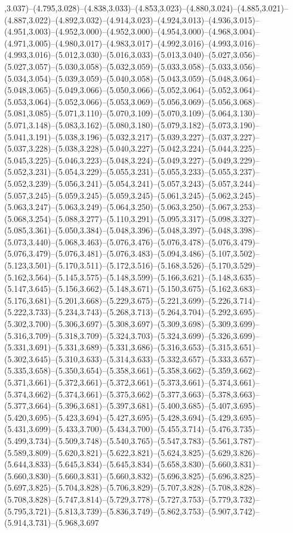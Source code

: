 ,3.037)--(4.795,3.028)--(4.838,3.033)--(4.853,3.023)--(4.880,3.024)--(4.885,3.021)--(4.887,3.022)--(4.892,3.032)--(4.914,3.023)--(4.924,3.013)--(4.936,3.015)--(4.951,3.003)--(4.952,3.000)--(4.952,3.000)--(4.954,3.000)--(4.968,3.004)--(4.971,3.005)--(4.980,3.017)--(4.983,3.017)--(4.992,3.016)--(4.993,3.016)--(4.993,3.016)--(5.012,3.030)--(5.016,3.033)--(5.013,3.040)--(5.027,3.056)--(5.027,3.057)--(5.030,3.058)--(5.032,3.059)--(5.033,3.058)--(5.033,3.056)--(5.034,3.054)--(5.039,3.059)--(5.040,3.058)--(5.043,3.059)--(5.048,3.064)--(5.048,3.065)--(5.049,3.066)--(5.050,3.066)--(5.052,3.064)--(5.052,3.064)--(5.053,3.064)--(5.052,3.066)--(5.053,3.069)--(5.056,3.069)--(5.056,3.068)--(5.081,3.085)--(5.071,3.110)--(5.070,3.109)--(5.070,3.109)--(5.064,3.130)--(5.071,3.148)--(5.083,3.162)--(5.080,3.180)--(5.079,3.182)--(5.073,3.190)--(5.041,3.191)--(5.038,3.196)--(5.032,3.217)--(5.039,3.227)--(5.037,3.227)--(5.037,3.228)--(5.038,3.228)--(5.040,3.227)--(5.042,3.224)--(5.044,3.225)--(5.045,3.225)--(5.046,3.223)--(5.048,3.224)--(5.049,3.227)--(5.049,3.229)--(5.052,3.231)--(5.054,3.229)--(5.055,3.231)--(5.055,3.233)--(5.055,3.237)--(5.052,3.239)--(5.056,3.241)--(5.054,3.241)--(5.057,3.243)--(5.057,3.244)--(5.057,3.245)--(5.059,3.245)--(5.059,3.245)--(5.061,3.245)--(5.062,3.245)--(5.063,3.247)--(5.063,3.249)--(5.064,3.250)--(5.063,3.250)--(5.067,3.253)--(5.068,3.254)--(5.088,3.277)--(5.110,3.291)--(5.095,3.317)--(5.098,3.327)--(5.085,3.361)--(5.050,3.384)--(5.048,3.396)--(5.048,3.397)--(5.048,3.398)--(5.073,3.440)--(5.068,3.463)--(5.076,3.476)--(5.076,3.478)--(5.076,3.479)--(5.076,3.479)--(5.076,3.481)--(5.076,3.483)--(5.094,3.486)--(5.107,3.502)--(5.123,3.501)--(5.170,3.511)--(5.172,3.516)--(5.168,3.526)--(5.170,3.529)--(5.162,3.564)--(5.145,3.575)--(5.148,3.599)--(5.166,3.621)--(5.148,3.635)--(5.147,3.645)--(5.156,3.662)--(5.148,3.671)--(5.150,3.675)--(5.162,3.683)--(5.176,3.681)--(5.201,3.668)--(5.229,3.675)--(5.221,3.699)--(5.226,3.714)--(5.222,3.733)--(5.234,3.743)--(5.268,3.713)--(5.264,3.704)--(5.292,3.695)--(5.302,3.700)--(5.306,3.697)--(5.308,3.697)--(5.309,3.698)--(5.309,3.699)--(5.316,3.709)--(5.318,3.709)--(5.324,3.703)--(5.324,3.699)--(5.326,3.699)--(5.331,3.691)--(5.331,3.689)--(5.331,3.686)--(5.316,3.653)--(5.315,3.651)--(5.302,3.645)--(5.310,3.633)--(5.314,3.633)--(5.332,3.657)--(5.333,3.657)--(5.335,3.658)--(5.350,3.654)--(5.358,3.661)--(5.358,3.662)--(5.359,3.662)--(5.371,3.661)--(5.372,3.661)--(5.372,3.661)--(5.373,3.661)--(5.374,3.661)--(5.374,3.662)--(5.374,3.661)--(5.375,3.662)--(5.377,3.663)--(5.378,3.663)--(5.377,3.664)--(5.396,3.681)--(5.397,3.681)--(5.400,3.685)--(5.407,3.695)--(5.420,3.695)--(5.423,3.694)--(5.427,3.695)--(5.428,3.694)--(5.429,3.695)--(5.431,3.699)--(5.433,3.700)--(5.434,3.700)--(5.455,3.714)--(5.476,3.735)--(5.499,3.734)--(5.509,3.748)--(5.540,3.765)--(5.547,3.783)--(5.561,3.787)--(5.589,3.809)--(5.620,3.821)--(5.622,3.821)--(5.624,3.825)--(5.629,3.826)--(5.644,3.833)--(5.645,3.834)--(5.645,3.834)--(5.658,3.830)--(5.660,3.831)--(5.660,3.830)--(5.660,3.831)--(5.660,3.832)--(5.696,3.825)--(5.696,3.825)--(5.697,3.825)--(5.704,3.828)--(5.706,3.829)--(5.707,3.828)--(5.708,3.828)--(5.708,3.828)--(5.747,3.814)--(5.729,3.778)--(5.727,3.753)--(5.779,3.732)--(5.795,3.721)--(5.813,3.739)--(5.836,3.749)--(5.862,3.753)--(5.907,3.742)--(5.914,3.731)--(5.968,3.697